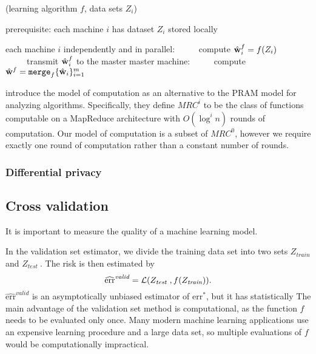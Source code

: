 \documentclass[thesis.tex]{subfiles}
\newcommand{\riskstar}{{\textrm{err}^*}}
\newcommand{\riskhat}{\widehat{\textrm{err}}}
\newcommand{\riskvalid}{\widehat{\textrm{err}}^\textit{valid}}
\newcommand{\merge}{\mkprocedure{merge}}
\newcommand{\wf}{{\hat\w^{f}}}
\begin{document}
\begin{algorithm}
    \caption{(learning algorithm $f$, data sets $Z_i$)}
    \vspace{0.1in}
    prerequisite: each machine $i$ has dataset $Z_i$ stored locally
    \begin{algorithmic}[1]
        \State each machine $i$ independently and in parallel:
        \State ~~~~~compute $\wf_i = f(Z_i)$
        \State ~~~~~transmit $\wf_i$ to the master
        \State master machine:
        \State ~~~~~compute $\wf = \merge_f\{\what_i\}_{i=1}^m$
    \end{algorithmic}
\end{algorithm}

\cite{karloff2010model} introduce the  model of computation as an alternative to the PRAM model for analyzing algorithms.
Specifically, they define $MRC^i$ to be the class of functions computable on a MapReduce architecture with $O(\log^i n)$ rounds of computation.
Our model of computation is a subset of $MRC^0$,
however we require exactly one round of computation rather than a constant number of rounds.

\subsubsection{Differential privacy}


\subsection{Cross validation}


It is important to measure the quality of a machine learning model.

\newcommand{\Ztrain}{Z_\textit{train}}
\newcommand{\Ztest }{Z_\textit{test }}
In the validation set estimator,
we divide the training data set into two sets $\Ztrain$ and $\Ztest$.
The risk is then estimated by
\begin{equation}
    \riskvalid = \Loss(\Ztest,f(\Ztrain))
    .
\end{equation}
$\riskvalid$ is an asymptotically unbiased estimator of $\riskstar$,
but it has statistically
The main advantage of the validation set method is computational,
as the function $f$ needs to be evaluated only once.
Many modern machine learning applications use an expensive learning procedure and a large data set,
so multiple evaluations of $f$ would be computationally impractical.
\end{document}
